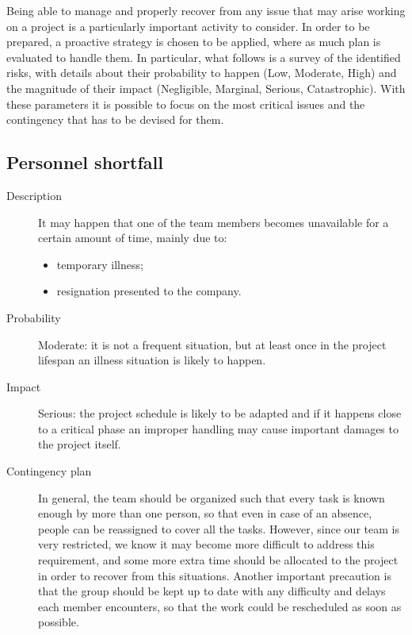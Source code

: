 Being able to manage and properly recover from any issue that may arise working on a project is a particularly important activity to consider. In order to be prepared, a proactive strategy is chosen to be applied, where as much plan is evaluated to handle them. In particular, what follows is a survey of the identified risks, with details about their probability to happen (Low, Moderate, High) and the magnitude of their impact (Negligible, Marginal, Serious, Catastrophic). With these parameters it is possible to focus on the most critical issues and the contingency that has to be devised for them.

\subsection*{Personnel shortfall}
	\begin{description}
		\item[Description] It may happen that one of the team members becomes unavailable for a certain amount of time, mainly due to:
			\begin{itemize}
				\item temporary illness;
				\item resignation presented to the company.
			\end{itemize}
		\item[Probability] Moderate: it is not a frequent situation, but at least once in the project lifespan an illness situation is likely to happen.
		\item[Impact] Serious: the project schedule is likely to be adapted and if it happens close to a critical phase an improper handling may cause important damages to the project itself.
		\item[Contingency plan] In general, the team should be organized such that every task is known enough by more than one person, so that even in case of an absence, people can be reassigned to cover all the tasks. However, since our team is very restricted, we know it may become more difficult to address this requirement, and some more extra time should be allocated to the project in order to recover from this situations. Another important precaution is that the group should be kept up to date with any difficulty and delays each member encounters, so that the work could be rescheduled as soon as possible.
	\end{description}

